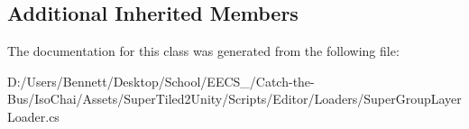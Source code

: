 \subsection*{Additional Inherited Members}


The documentation for this class was generated from the following file\+:\begin{DoxyCompactItemize}
\item 
D\+:/\+Users/\+Bennett/\+Desktop/\+School/\+E\+E\+C\+S\+\_/\+Catch-\/the-\/\+Bus/\+Iso\+Chai/\+Assets/\+Super\+Tiled2\+Unity/\+Scripts/\+Editor/\+Loaders/Super\+Group\+Layer\+Loader.\+cs\end{DoxyCompactItemize}
